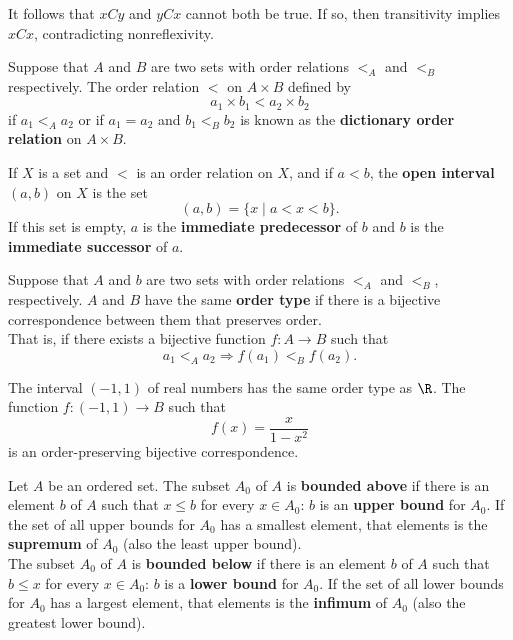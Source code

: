 \begin{remark}
It follows that $xCy$ and $yCx$ cannot both be true. If so, then transitivity implies $xCx$, contradicting nonreflexivity.    
\end{remark}

\begin{eg}
Suppose that $A$ and $B$ are two sets with order relations $<_A$ and $<_B$ respectively. The order relation $<$ on $A \times B$ defined by
\[
    a_1 \times b_1 < a_2 \times b_2
\]
if $a_1 <_A a_2$ or if $a_1 = a_2$ and $b_1 <_B b_2$ is known as the \textbf{dictionary order relation} on $A \times B$.
\end{eg}

\begin{definition}
If $X$ is a set and $<$ is an order relation on $X$, and if $a < b$, the \textbf{open interval} $(a, b)$ on $X$ is the set
\[
    (a, b) = \{ x \mid a < x < b \}. 
\] 
If this set is empty, $a$ is the \textbf{immediate predecessor} of $b$ and $b$ is the \textbf{immediate successor} of $a$.
\end{definition}

\begin{definition}
Suppose that $A$ and $b$ are two sets with order relations $<_A$ and $<_B$, respectively. $A$ and $B$ have the same \textbf{order type} 
if there is a bijective correspondence between them that preserves order. \\

That is, if there exists a bijective function $f \colon A \rightarrow B$ such that
\[
    a_1 <_A a_2 \Rightarrow f(a_1) <_B f(a_2).
\]
\end{definition}

\begin{eg}
The interval $(-1, 1)$ of real numbers has the same order type as $\R$. The function $f \colon (-1, 1) \rightarrow B$ such that
\[
    f(x) = \frac{x}{1-x^2}
\]
is an order-preserving bijective correspondence.
\end{eg}

\begin{definition}
Let $A$ be an ordered set. The subset $A_0$ of $A$ is \textbf{bounded above} if there is an element $b$ of $A$ such that $x \leq b$ for every $x \in A_0$: 
$b$ is an \textbf{upper bound} for $A_0$. If the set of all upper bounds for $A_0$ has a smallest element, that elements is the \textbf{supremum} of $A_0$ (also the least upper bound). \\

The subset $A_0$ of $A$ is \textbf{bounded below} if there is an element $b$ of $A$ such that $b \leq x$ for every $x \in A_0$: 
$b$ is a \textbf{lower bound} for $A_0$. If the set of all lower bounds for $A_0$ has a largest element, that elements is the \textbf{infimum} of $A_0$ (also the greatest lower bound). \\
\end{definition}

